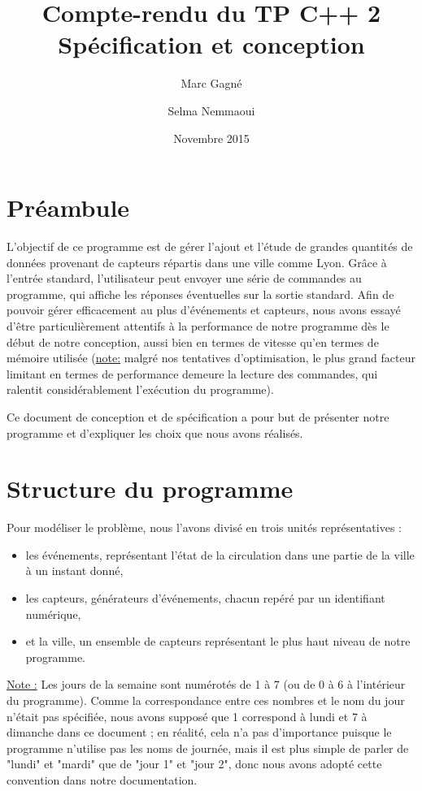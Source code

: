 \documentclass[11pt,a4paper]{article}
\begin{document}
\title{
	Compte-rendu du TP C++ 2\\
	Spécification et conception
}
\author{
	Marc Gagné\\
	\and
	Selma Nemmaoui
}
\date{Novembre 2015}
\maketitle

\section*{Préambule}

L'objectif de ce programme est de gérer l'ajout et l'étude de grandes quantités de données provenant de capteurs répartis dans une ville comme Lyon. Grâce à l'entrée standard, l'utilisateur peut envoyer une série de commandes au programme, qui affiche les réponses éventuelles sur la sortie standard. Afin de pouvoir gérer efficacement au plus  d'événements et  capteurs, nous avons essayé d'être particulièrement attentifs à la performance de notre programme dès le début de notre conception, aussi bien en termes de vitesse qu'en termes de mémoire utilisée (\underline{note:} malgré nos tentatives d'optimisation, le plus grand facteur limitant en termes de performance demeure la lecture des commandes, qui ralentit considérablement l'exécution du programme).

Ce document de conception et de spécification a pour but de présenter notre programme et d'expliquer les choix que nous avons réalisés.

\section{Structure du programme}

Pour modéliser le problème, nous l'avons divisé en trois unités représentatives :
\begin{itemize}
  \item les événements, représentant l'état de la circulation dans une partie de la ville à un instant donné,
  \item les capteurs, générateurs d'événements, chacun repéré par un identifiant numérique,
  \item et la ville, un ensemble de capteurs représentant le plus haut niveau de notre programme.
\end{itemize}

\underline{Note :} Les jours de la semaine sont numérotés de 1 à 7 (ou de 0 à 6 à l'intérieur du programme). Comme la correspondance entre ces nombres et le nom du jour n'était pas spécifiée, nous avons supposé que 1 correspond à lundi et 7 à dimanche dans ce document ; en réalité, cela n'a pas d'importance puisque le programme n'utilise pas les noms de journée, mais il est plus simple de parler de "lundi" et "mardi" que de "jour 1" et "jour 2", donc nous avons adopté cette convention dans notre documentation.
\end{document}
